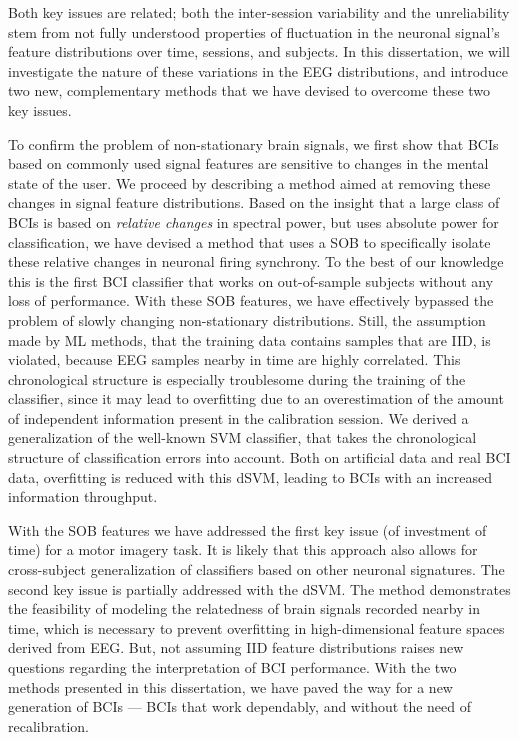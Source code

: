Both key issues are related; both the inter-session variability and the
unreliability stem from not fully understood properties of fluctuation in the
neuronal signal's feature distributions over time, sessions, and subjects. In
this dissertation, we will investigate the nature of these variations in the
\ac{EEG} distributions, and introduce two new, complementary methods that we
have devised to overcome these two key issues.
 
To confirm the problem of non-stationary brain signals, we first show that
\acp{BCI} based on commonly used signal features are sensitive to changes in
the mental state of the user.
% 
We proceed by describing a method aimed at removing these changes in signal
feature distributions. Based on the insight that a large class of \acp{BCI} is
based on \emph{relative changes} in spectral power, but uses absolute power for
classification, we have devised a method that uses a \ac{SOB} to specifically
isolate these relative changes in neuronal firing synchrony. To the best of our
knowledge this is the first \ac{BCI} classifier that works on out-of-sample
subjects without any loss of performance.
%
With these \ac{SOB} features, we have effectively bypassed the problem of
slowly changing non-stationary distributions. Still, the assumption made by
\ac{ML} methods, that the training data contains samples that are \ac{IID}, is
violated, because \ac{EEG} samples nearby in time are highly correlated. This
chronological structure is especially troublesome during the training of the
classifier, since it may lead to overfitting due to an overestimation of the
amount of independent information present in the calibration session.
%
We derived a generalization of the well-known \ac{SVM} classifier, that takes
the chronological structure of classification errors into account. Both on
artificial data and real \ac{BCI} data, overfitting is reduced with this
\ac{dSVM}, leading to \acp{BCI} with an increased information throughput.

With the \ac{SOB} features we have addressed the first key issue (of investment
of time) for a motor imagery task. It is likely that this approach also allows
for cross-subject generalization of classifiers based on other neuronal
signatures. The second key issue is partially addressed with the \ac{dSVM}. The
method demonstrates the feasibility of modeling the relatedness of brain
signals recorded nearby in time, which is necessary to prevent overfitting in
high-dimensional feature spaces derived from \ac{EEG}. But, not assuming
\ac{IID} feature distributions raises new questions regarding the
interpretation of \ac{BCI} performance. With the two methods presented in this
dissertation, we have paved the way for a new generation of \acp{BCI} --- \acp{BCI}
that work dependably, and without the need of recalibration.
